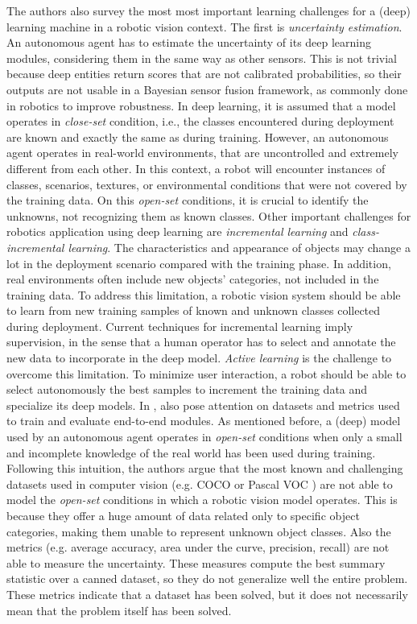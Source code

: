  The authors also survey the most most important learning challenges for a (deep) learning machine in a robotic vision context. The first is \textit{uncertainty estimation}. An autonomous agent has to estimate the uncertainty of its deep learning modules, considering them in the same way as other sensors. This is not trivial because deep entities return scores that are not calibrated probabilities, so their outputs are not usable in a Bayesian sensor fusion framework, as commonly done in robotics to improve robustness. In deep learning, it is assumed that a model operates in \textit{close-set} condition,  i.e., the classes encountered during deployment are known and exactly the same as during training. However, an autonomous agent operates in real-world environments, that are uncontrolled and extremely different from each other. In this context, a robot will encounter instances of classes, scenarios, textures, or environmental conditions that were not covered by the training data. On this \textit{open-set} conditions, it is crucial to identify the unknowns, not recognizing them as known classes. Other important challenges for robotics application using deep learning are \textit{incremental learning} and \textit{class-incremental learning}. The characteristics and appearance of objects may change a lot in the deployment scenario compared with the training phase. In addition, real environments often include new objects' categories, not included in the training data. To address this limitation, a robotic vision system should be able to learn from new training samples of known and unknown classes collected during deployment. Current techniques for incremental learning imply supervision, in the sense that a human operator has to select and annotate the new data to incorporate in the deep model. \textit{Active learning} is the challenge to overcome this limitation. To minimize user interaction, a robot should be able to select autonomously the best samples to increment the training data and specialize its deep models. In \cite{surveydeeplimits}, \citeauthor{surveydeeplimits} also pose attention on datasets and metrics used to train and evaluate end-to-end modules. As mentioned before, a (deep) model used by an autonomous agent operates in \textit{open-set} conditions when only a small and incomplete knowledge of the real world has been used during training. Following this intuition, the authors argue that the most known and challenging datasets used in computer vision (e.g. COCO \cite{coco} or Pascal VOC \cite{pascal}) are not able to model the \textit{open-set} conditions in which a robotic vision model operates. This is because they offer a huge amount of data related only to specific object categories, making them unable to represent unknown object classes. Also the metrics (e.g. average accuracy, area under the curve, precision, recall) are not able to measure the uncertainty. These measures compute the best summary statistic over a canned dataset, so they do not generalize well the entire problem. These metrics indicate that a dataset has been solved, but it does not necessarily mean that the problem itself has been solved.  
 
